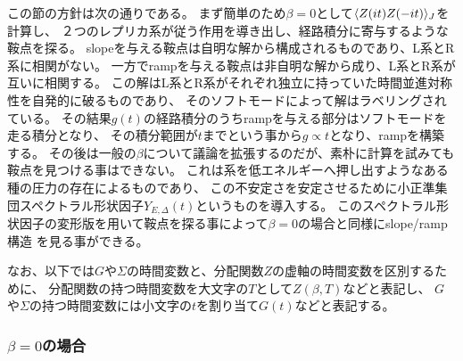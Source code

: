 この節の方針は次の通りである。
まず簡単のため$\beta=0$として$\langle Z(it)Z(-it) \rangle_J$を計算し、
２つのレプリカ系が従う作用を導き出し、経路積分に寄与するような鞍点を探る。
slopeを与える鞍点は自明な解から構成されるものであり、L系とR系に相関がない。
一方でrampを与える鞍点は非自明な解から成り、L系とR系が互いに相関する。
この解はL系とR系がそれぞれ独立に持っていた時間並進対称性を自発的に破るものであり、
そのソフトモードによって解はラベリングされている。
その結果$g(t)$の経路積分のうちrampを与える部分はソフトモードを走る積分となり、
その積分範囲が$t$までという事から$g \propto t$となり、rampを構築する。
その後は一般の$\beta$について議論を拡張するのだが、素朴に計算を試みても鞍点を見つける事はできない。
これは系を低エネルギーへ押し出すようなある種の圧力の存在によるものであり、
この不安定さを安定させるために小正準集団スペクトラル形状因子$Y_{E,\Delta}(t)$というものを導入する。
このスペクトラル形状因子の変形版を用いて鞍点を探る事によって$\beta = 0$の場合と同様にslope/ramp構造
を見る事ができる。

なお、以下では$G$や$\Sigma$の時間変数と、分配関数$Z$の虚軸の時間変数を区別するために、
分配関数の持つ時間変数を大文字の$T$として$Z(\beta, T)$などと表記し、
$G$や$\Sigma$の持つ時間変数には小文字の$t$を割り当て$G(t)$などと表記する。

\subsubsection{$\beta = 0$の場合}



\pagebreak